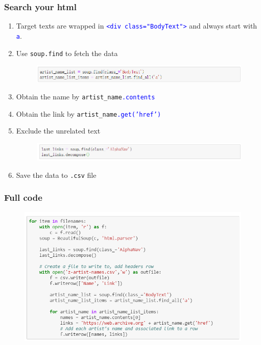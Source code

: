 \documentclass[red]{beamer}
\begin{document}
\begin{frame}
\frametitle{Search your html}
\begin{enumerate}
	\item Target texts are wrapped in \textcolor{blue}{\texttt{<div class="BodyText">}} and always start with \textcolor{blue}{\texttt{a}}.
	\item Use \texttt{soup.find} to fetch the data
	\begin{figure}
		\centering
		\includegraphics[width=1\linewidth]{figure/screenshot033}
	\end{figure}
	\item Obtain the name by \texttt{artist\_name\textcolor{blue}{.contents}}
	\item Obtain the link by \texttt{artist\_name\textcolor{blue}{.get('href')}}
	\item Exclude the unrelated text
	\begin{figure}
		\centering
		\includegraphics[width=1\linewidth]{figure/screenshot034}
	\end{figure}
	\item Save the data to \texttt{.csv} file
\end{enumerate}
\end{frame}

\begin{frame}
\frametitle{Full code}
\begin{figure}
	\centering
	\includegraphics[width=1\linewidth]{figure/screenshot035}
\end{figure}
\end{frame}
\end{document}
